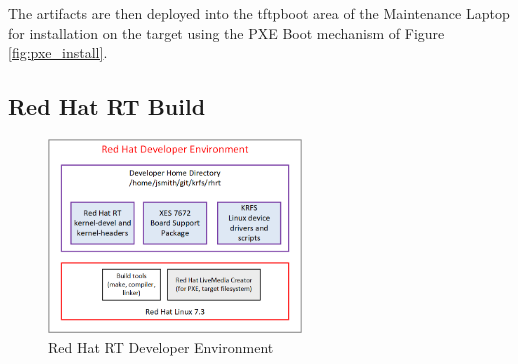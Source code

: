 \documentclass[12pt]{article}
\begin{document}
\begin{table}[H]
    \captionsetup{width=0.9\linewidth}
    \caption{Artifacts created with RedHawk Architect}
    \label{tab:architect_artifacts}
\end{table}

The artifacts are then deployed into the tftpboot area of the Maintenance
Laptop for installation on the target using the PXE Boot mechanism of Figure
\ref{fig:pxe_install}.


%
\subsection{Red Hat RT Build}

\begin{figure}[H]
    \begin{center}
    \includegraphics[width=0.6\textwidth]{img/red_hat_dev}
    \caption{Red Hat RT Developer Environment}
    \label{fig:red_hat_dev}
    \end{center}
\end{figure}
\end{document}

